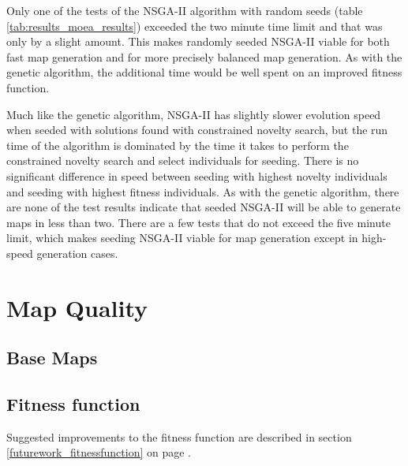 Only one of the tests of the NSGA-II algorithm with random seeds (table \ref{tab:results_moea_results}) exceeded the two minute time limit and that was only by a slight amount. This makes randomly seeded NSGA-II viable for both fast map generation and for more precisely balanced map generation. As with the genetic algorithm, the additional time would be well spent on an improved fitness function.

Much like the genetic algorithm, NSGA-II has slightly slower evolution speed when seeded with solutions found with constrained novelty search, but the run time of the algorithm is dominated by the time it takes to perform the constrained novelty search and select individuals for seeding. There is no significant difference in speed between seeding with highest novelty individuals and seeding with highest fitness individuals. As with the genetic algorithm, there are none of the test results indicate that seeded NSGA-II will be able to generate maps in less than two. There are a few tests that do not exceed the five minute limit, which makes seeding NSGA-II viable for map generation except in high-speed generation cases.

\section{Map Quality}
\label{discussion_quality}

\subsection{Base Maps}
\label{discussion_quality_basemaps}

\subsection{Fitness function}
\label{discussion_quality_fitnessfunction}



Suggested improvements to the fitness function are described in section \ref{futurework_fitnessfunction} on page \pageref{futurework_fitnessfunction}.

